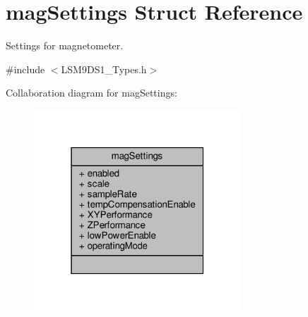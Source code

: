 \hypertarget{structmagSettings}{}\section{mag\+Settings Struct Reference}
\label{structmagSettings}


Settings for magnetometer.  




{\ttfamily \#include $<$L\+S\+M9\+D\+S1\+\_\+\+Types.\+h$>$}



Collaboration diagram for mag\+Settings\+:\nopagebreak
\begin{figure}[H]
\begin{center}
\leavevmode
\includegraphics[width=220pt]{structmagSettings__coll__graph}
\end{center}
\end{figure}
